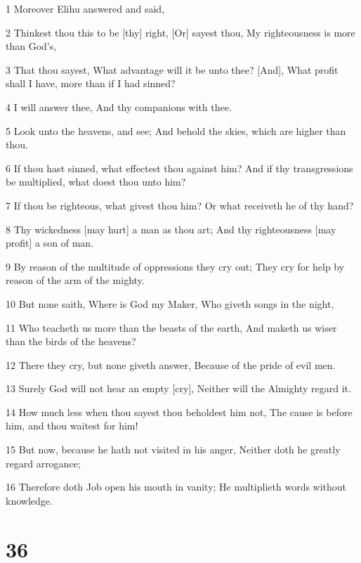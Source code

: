 \par 1 Moreover Elihu answered and said,
\par 2 Thinkest thou this to be [thy] right, [Or] sayest thou, My righteousness is more than God's,
\par 3 That thou sayest, What advantage will it be unto thee? [And], What profit shall I have, more than if I had sinned?
\par 4 I will answer thee, And thy companions with thee.
\par 5 Look unto the heavens, and see; And behold the skies, which are higher than thou.
\par 6 If thou hast sinned, what effectest thou against him? And if thy transgressions be multiplied, what doest thou unto him?
\par 7 If thou be righteous, what givest thou him? Or what receiveth he of thy hand?
\par 8 Thy wickedness [may hurt] a man as thou art; And thy righteousness [may profit] a son of man.
\par 9 By reason of the multitude of oppressions they cry out; They cry for help by reason of the arm of the mighty.
\par 10 But none saith, Where is God my Maker, Who giveth songs in the night,
\par 11 Who teacheth us more than the beasts of the earth, And maketh us wiser than the birds of the heavens?
\par 12 There they cry, but none giveth answer, Because of the pride of evil men.
\par 13 Surely God will not hear an empty [cry], Neither will the Almighty regard it.
\par 14 How much less when thou sayest thou beholdest him not, The cause is before him, and thou waitest for him!
\par 15 But now, because he hath not visited in his anger, Neither doth he greatly regard arrogance;
\par 16 Therefore doth Job open his mouth in vanity; He multiplieth words without knowledge.

\chapter{36}

